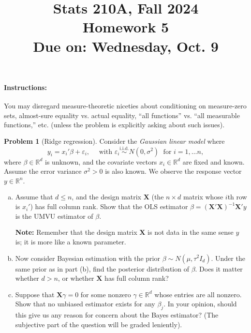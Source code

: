 \documentclass{article}
\newcommand{\RR}{\mathbb{R}}
\newcommand{\simiid}{\overset{\text{i.i.d.}}{\sim}}
\newcommand{\ep}{\varepsilon}
\theoremstyle{definition}
\newtheorem{problem}{Problem}
\begin{document}
\title{Stats 210A, Fall 2024\\
  Homework 5 \\
  {\large {\bf Due on}: Wednesday, Oct. 9}}
\date{}

\maketitle

\paragraph{Instructions:} You may disregard measure-theoretic niceties about conditioning on measure-zero sets, almost-sure equality vs. actual equality, ``all functions'' vs. ``all measurable functions,'' etc. (unless the problem is explicitly asking about such issues).


\begin{problem}[Ridge regression]
Consider the {\em Gaussian linear model} where
\[
y_i = x_i' \beta + \ep_i, \quad \text{ with } \ep_i \simiid N(0,\sigma^2) \;\text{ for } i =1, \ldots n,
\]
where $\beta \in \RR^d$ is unknown, and the covariate vectors $x_i \in \RR^d$ are fixed and known. Assume the error variance $\sigma^2>0$ is also known. We observe the response vector $y \in \RR^n$.
\begin{enumerate}[(a)]
\item Assume that $d \leq n$, and the design matrix $\mathbf{X}$ (the $n \times d$ matrix whose $i$th row is $x_i'$) has full column rank. Show that the OLS estimator $\hat\beta = (\mathbf{X}'\mathbf{X})^{-1}\mathbf{X}'y$ is the UMVU estimator of $\beta$. 

{\bf Note:} Remember that the design matrix $\mathbf{X}$ is not data in the same sense $y$ is; it is more like a known parameter.




\item Now consider Bayesian estimation with the prior $\beta \sim N(\mu, \tau^2 I_d)$.  Under the same prior as in part (b), find the posterior distribution of $\beta$. Does it matter whether $d > n$, or whether $\mathbf{X}$ has full column rank?






\item Suppose that $\mathbf{X}\gamma = 0$ for some nonzero $\gamma \in \RR^d$ whose entries are all nonzero. Show that no unbiased estimator exists for any $\beta_j$. In your opinion, should this give us any reason for concern about the Bayes estimator? (The subjective part of the question will be graded leniently).



\end{enumerate}
\end{problem}
\end{document}
